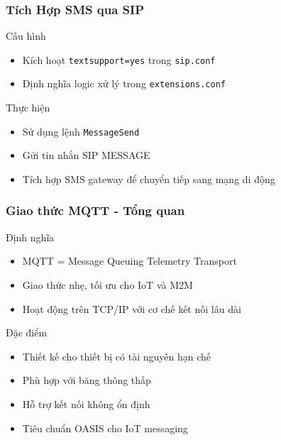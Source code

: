 \begin{frame}
\frametitle{Tích Hợp SMS qua SIP}

\begin{block}{Cấu hình}
\begin{itemize}
\item Kích hoạt \texttt{textsupport=yes} trong \texttt{sip.conf}
\item Định nghĩa logic xử lý trong \texttt{extensions.conf}
\end{itemize}
\end{block}

\begin{block}{Thực hiện}
\begin{itemize}
\item Sử dụng lệnh \texttt{MessageSend}
\item Gửi tin nhắn SIP MESSAGE
\item Tích hợp SMS gateway để chuyển tiếp sang mạng di động
\end{itemize}
\end{block}

\end{frame}

\begin{frame}
\frametitle{Giao thức MQTT - Tổng quan}

\begin{block}{Định nghĩa}
\begin{itemize}
\item MQTT = Message Queuing Telemetry Transport
\item Giao thức nhẹ, tối ưu cho IoT và M2M
\item Hoạt động trên TCP/IP với cơ chế kết nối lâu dài
\end{itemize}
\end{block}

\begin{block}{Đặc điểm}
\begin{itemize}
\item Thiết kế cho thiết bị có tài nguyên hạn chế
\item Phù hợp với băng thông thấp
\item Hỗ trợ kết nối không ổn định
\item Tiêu chuẩn OASIS cho IoT messaging
\end{itemize}
\end{block}

\end{frame}

